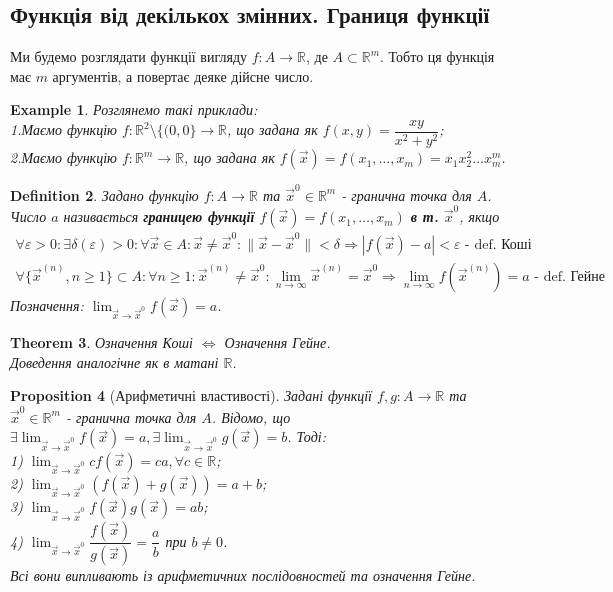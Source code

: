 \documentclass[a4paper, 10pt]{article}
\def\huge{\displaystyle}
\theoremstyle{theoremdd}
\newtheorem{theorem}{Theorem}[subsection]
\theoremstyle{theoremdd}
\theoremstyle{theoremdd}
\newtheorem{definition}[theorem]{Definition}
\theoremstyle{theoremdd}
\theoremstyle{theoremdd}
\newtheorem{example}[theorem]{Example}
\theoremstyle{theoremdd}
\newtheorem{proposition}[theorem]{Proposition}
\theoremstyle{theoremdd}
\theoremstyle{theoremdd}
\theoremstyle{theoremdd}
\newcommand\Norm[1]{\lVert#1\rVert}
\begin{document}
\subsection{Функція від декількох змінних. Границя функції}
Ми будемо розглядати функції вигляду $f: A \to \mathbb{R}$, де $A \subset \mathbb{R}^m$. Тобто ця функція має $m$ аргументів, а повертає деяке дійсне число.

\begin{example} Розглянемо такі приклади:\\
1.Маємо функцію $f: \mathbb{R}^2 \setminus \{(0,0\} \to \mathbb{R}$, що задана як $f(x,y) = \dfrac{xy}{x^2+y^2}$;\\
2.Маємо функцію $f: \mathbb{R}^m \to \mathbb{R}$, що задана як $f(\vec{x}) = f(x_1,\dots,x_m) = x_1 x_2^2 \dots x_m^m$.
\end{example}

\begin{definition}
Задано функцію $f: A \to \mathbb{R}$ та $\vec{x}^0 \in \mathbb{R}^m$ - гранична точка для $A$.\\
Число $a$ називається \textbf{границею функції} $f(\vec{x}) = f(x_1,\dots,x_m)$ \textbf{в т.} $\vec{x}^0$, якщо
\begin{align*}
\forall \varepsilon > 0: \exists \delta(\varepsilon) > 0: \forall \vec{x} \in A: \vec{x} \neq \vec{x}^0: \Norm{\vec{x} - \vec{x}^0} < \delta \Rightarrow |f(\vec{x}) - a| < \varepsilon \textrm{ - def. Коші}\\
\forall \{\vec{x}^{(n)}, n \geq 1\} \subset A: \forall n \geq 1: \vec{x}^{(n)} \neq \vec{x}^0: \huge \lim_{n \to \infty} \vec{x}^{(n)} = \vec{x}^0 \Rightarrow \lim_{n \to \infty} f(\vec{x}^{(n)}) = a \textrm{ - def. Гейне}
\end{align*}
Позначення: $\huge \lim_{\vec{x} \to \vec{x}^0} f(\vec{x}) = a$.
\end{definition}

\begin{theorem}
Означення Коші $\iff$ Означення Гейне.\\
\textit{Доведення аналогічне як в матані $\mathbb{R}$.}
\end{theorem}

\begin{proposition}[Арифметичні властивості]
Задані функції $f,g: A \to \mathbb{R}$ та $\vec{x}^0 \in \mathbb{R}^m$ - гранична точка для $A$. Відомо, що \\ $\exists \huge \lim_{\vec{x} \to \vec{x}^0} f(\vec{x}) = a, \exists \lim_{\vec{x} \to \vec{x}^0} g(\vec{x}) = b$. Тоді:\\
1) $\huge \lim_{\vec{x} \to \vec{x}^0} cf(\vec{x}) = ca, \forall c \in \mathbb{R}$;\\
2) $\huge \lim_{\vec{x} \to \vec{x}^0} (f(\vec{x}) + g(\vec{x})) = a + b$;\\
3) $\huge \lim_{\vec{x} \to \vec{x}^0} f(\vec{x})g(\vec{x}) = ab$;\\
4) $\huge \lim_{\vec{x} \to \vec{x}^0} \dfrac{f(\vec{x})}{g(\vec{x})} = \dfrac{a}{b}$ при $b \neq 0$.\\
\textit{Всі вони випливають із арифметичних послідовностей та означення Гейне.}
\end{proposition}
\end{document}
